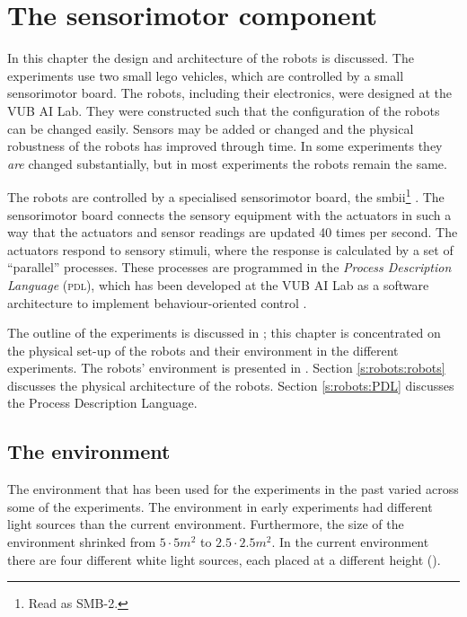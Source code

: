 \chapter{The sensorimotor component}\label{ch:robots}

In this chapter the design and architecture of the robots is discussed. The experiments use two small {\sc lego} vehicles, which are controlled by a small sensorimotor board. The robots, including their electronics, were designed at the VUB AI Lab. They were constructed such that the configuration of the robots can be changed easily. Sensors may be added or changed and the physical robustness of the robots has improved through time. In some experiments they {\it are} changed substantially, but in most experiments the robots remain the same.

The robots are controlled by a specialised sensorimotor board, the {\sc smbii}\footnote{Read as SMB-2.} \citep{vereertbrugghen:1996}. The sensorimotor board connects the sensory equipment with the actuators in such a way that the actuators and sensor readings are updated 40 times per second. The actuators respond to sensory stimuli, where the response is calculated by a set of ``parallel'' processes. These processes are programmed in the {\em Process Description Language} (\textsc{pdl}), which has been developed at the VUB AI Lab as a software architecture to implement behaviour-oriented control \citep{steels:1994b}. 

The outline of the experiments is discussed in ; this chapter is concentrated on the physical set-up of the robots and their environment in the different experiments. The robots' environment is presented in . Section \ref{s:robots:robots} discusses the physical architecture of the robots. Section \ref{s:robots:PDL} discusses the Process Description Language. 

\section{The environment}\label{s:robots:envir}

The environment that has been used for the experiments in the past varied across some of the experiments. The environment in early experiments \citep{steelsvogt:1997,vogt:1998b,vogt:1998a} had different light sources than the current environment. Furthermore, the size of the environment shrinked from $5\cdot 5 m^2$ to $2.5\cdot 2.5 m^2$. In the current environment there are four different white light sources, each placed at a different height (). 

